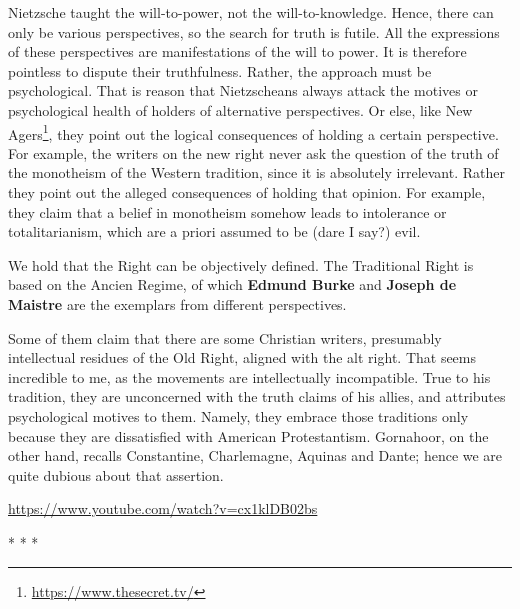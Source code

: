Nietzsche taught the will-to-power, not the will-to-knowledge. Hence, there can only be various perspectives, so the search for truth is futile. All the expressions of these perspectives are manifestations of the will to power. It is therefore pointless to dispute their truthfulness. Rather, the approach must be psychological. That is reason that Nietzscheans always attack the motives or psychological health of holders of alternative perspectives. Or else, like New Agers\footnote{\url{https://www.thesecret.tv/}}, they point out the logical consequences of holding a certain perspective. For example, the writers on the new right never ask the question of the truth of the monotheism of the Western tradition, since it is absolutely irrelevant. Rather they point out the alleged consequences of holding that opinion. For example, they claim that a belief in monotheism somehow leads to intolerance or totalitarianism, which are a priori assumed to be (dare I say?) evil.

We hold that the Right can be objectively defined. The Traditional Right is based on the Ancien Regime, of which \textbf{Edmund Burke} and \textbf{Joseph de Maistre} are the exemplars from different perspectives.

Some of them claim that there are some Christian writers, presumably intellectual residues of the Old Right, aligned with the alt right. That seems incredible to me, as the movements are intellectually incompatible. True to his tradition, they are unconcerned with the truth claims of his allies, and attributes psychological motives to them. Namely, they embrace those traditions only because they are dissatisfied with American Protestantism. Gornahoor, on the other hand, recalls Constantine, Charlemagne, Aquinas and Dante; hence we are quite dubious about that assertion.

\url{https://www.youtube.com/watch?v=cx1klDB02bs} 


\begin{center}* * *\end{center}

